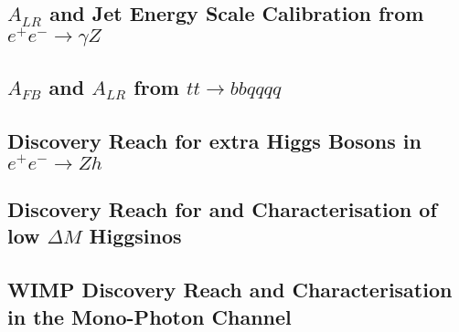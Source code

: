 \subsection{$A_{LR}$ and Jet Energy Scale Calibration from $e^+e^- \to \gamma Z$}
\subsection{$A_{FB}$ and $A_{LR}$ from $tt \to bb qqqq$}

\subsection{Discovery Reach for extra Higgs Bosons in $e^+e^- \to Zh$}
\subsection{Discovery Reach for and Characterisation of low $\Delta M$ Higgsinos}
\subsection{WIMP Discovery Reach and Characterisation in the Mono-Photon Channel}

